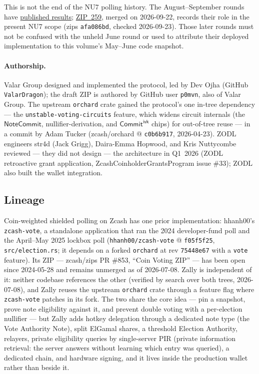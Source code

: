 \documentclass[11pt,a4paper]{article}
\theoremstyle{definition}
\newcommand{\NoteCommit}{\ensuremath{\mathsf{NoteCommit}}}
\newcommand{\CommitIvk}{\ensuremath{\mathsf{Commit}^{\mathsf{ivk}}}}
\begin{document}
This is not the end of the NU7 polling history. The August--September
rounds have \href{https://forum.zcashcommunity.com/t/nu7-sentiment-polls-results/57590}{published results};
\href{https://zips.z.cash/zip-0259}{ZIP~259}, merged on 2026-09-22,
records their role in the present NU7 scope (\textsf{zips}
\texttt{afa086bd}, checked 2026-09-23). Those later rounds must not be
confused with the unheld June round or used to attribute their deployed
implementation to this volume's May--June code snapshot.

\paragraph{Authorship.} Valar Group designed and implemented the protocol,
led by Dev Ojha (GitHub \texttt{ValarDragon}); the draft ZIP is authored by
GitHub user \texttt{p0mvn}, also of Valar Group. The upstream
\texttt{orchard} crate gained the protocol's one in-tree dependency --- the
\texttt{unstable-voting-circuits} feature, which widens circuit internals
(the \NoteCommit{}, nullifier-derivation, and \CommitIvk{} chips) for
out-of-tree reuse --- in a commit by Adam Tucker (zcash/orchard @
\texttt{c0b6b917}, 2026-04-23). ZODL engineers str4d (Jack Grigg),
Daira-Emma Hopwood, and Kris Nuttycombe reviewed --- they did not design ---
the architecture in Q1~2026 (ZODL retroactive grant application,
ZcashCoinholderGrantsProgram issue \#33); ZODL also built the wallet
integration.

\subsection{Lineage}\label{sec:vote-lineage}

Coin-weighted shielded polling on Zcash has one prior implementation:
hhanh00's \texttt{zcash-vote}, a standalone application that ran the 2024
developer-fund poll and the April--May 2025 lockbox poll
(\texttt{hhanh00/zcash-vote} @ \texttt{f05f5f25},
\texttt{src/election.rs}; it depends on a forked \texttt{orchard} at rev
\texttt{75448e67} with a \texttt{vote} feature). Its ZIP --- zcash/zips PR
\#853, ``Coin Voting ZIP'' --- has been open since 2024-05-28 and remains
unmerged as of 2026-07-08. Zally is independent of it: neither codebase
references the other (verified by search over both trees, 2026-07-08), and
Zally reuses the upstream \texttt{orchard} crate through a feature flag
where \texttt{zcash-vote} patches in its fork. The two share the
core idea --- pin a snapshot, prove note eligibility against it, and prevent
double voting with a per-election nullifier --- but Zally adds hotkey
delegation through a dedicated note type (the Vote Authority Note), split
ElGamal shares, a threshold Election Authority, relayers, private
eligibility queries by single-server PIR (private information retrieval:
the server answers without learning which entry was queried), a dedicated
chain, and hardware signing, and it lives inside the production wallet
rather than beside it.
\end{document}

